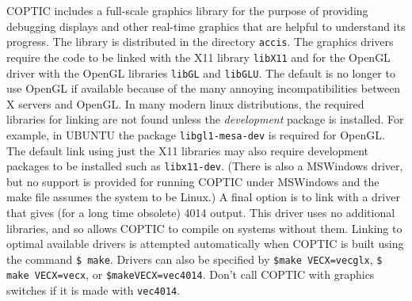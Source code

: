 \documentclass[12pt]{article}
\begin{document}
COPTIC includes a full-scale graphics library for the purpose of
providing debugging displays and other real-time graphics that are
helpful to understand its progress. The library is distributed in the
directory \verb!accis!. The graphics drivers require the code to be
linked with the X11 library \verb!libX11! and for the OpenGL driver
with the OpenGL libraries \verb!libGL! and \verb!libGLU!. The default
is no longer to use OpenGL if available because of the many annoying
incompatibilities between X servers and OpenGL. In many modern linux
distributions, the required libraries for linking are not found unless
the \emph{development} package is installed. For example, in UBUNTU
the package \verb!libgl1-mesa-dev!  is required for OpenGL. The
default link using just the X11 libraries may also require development
packages to be installed such as \verb!libx11-dev!. (There is also a
MSWindows driver, but no support is provided for running COPTIC under
MSWindows and the make file assumes the system to be Linux.) A final
option is to link with a driver that gives (for a long time obsolete)
4014 output. This driver uses no additional libraries, and so allows
COPTIC to compile on systems without them. Linking to optimal
available drivers is attempted automatically when COPTIC is built
using the command
\verb!$ make!.  Drivers can also be specified by
\verb!$make VECX=vecglx!, \verb!$ make VECX=vecx!, or
\verb!$makeVECX=vec4014!. 
Don't call COPTIC with graphics switches if it is made
with \verb!vec4014!.
\end{document}

